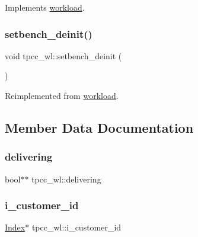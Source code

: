 Implements \hyperlink{classworkload_a3feee79af04069f6c1ad6b7f9b0a045a}{workload}.

\mbox{\label{classtpcc__wl_ac89b938cbaf311844d79f3946df49005}} 
\subsubsection{\texorpdfstring{setbench\+\_\+deinit()}{setbench\_deinit()}}
{\footnotesize\ttfamily void tpcc\+\_\+wl\+::setbench\+\_\+deinit (\begin{DoxyParamCaption}{ }\end{DoxyParamCaption})\hspace{0.3cm}{\ttfamily [virtual]}}



Reimplemented from \hyperlink{classworkload_a4614189e85fbaaf2003b7db4c2a7b8b9}{workload}.



\subsection{Member Data Documentation}
\mbox{\label{classtpcc__wl_aed8e979c419bcd6c656f10ba744da75b}} 
\subsubsection{\texorpdfstring{delivering}{delivering}}
{\footnotesize\ttfamily bool$\ast$$\ast$ tpcc\+\_\+wl\+::delivering}

\mbox{\label{classtpcc__wl_a2ce0867b3a24e9f57e06a2733c7829ab}} 
\subsubsection{\texorpdfstring{i\+\_\+customer\+\_\+id}{i\_customer\_id}}
{\footnotesize\ttfamily \hyperlink{classIndex}{Index}$\ast$ tpcc\+\_\+wl\+::i\+\_\+customer\+\_\+id}

